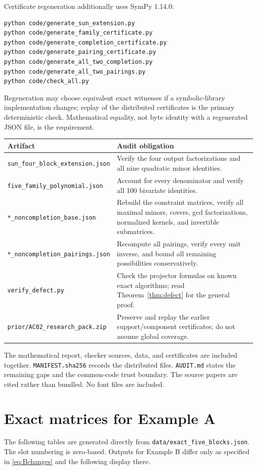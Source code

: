 \documentclass[11pt]{article}
\theoremstyle{definition}\newtheorem{definition}[theorem]{Definition}
\newcommand{\file}[1]{\nolinkurl{#1}}
\begin{document}
Certificate regeneration additionally uses SymPy 1.14.0:
\begin{lstlisting}
python code/generate_sun_extension.py
python code/generate_family_certificate.py
python code/generate_completion_certificate.py
python code/generate_pairing_certificate.py
python code/generate_all_two_completion.py
python code/generate_all_two_pairings.py
python code/check_all.py
\end{lstlisting}
Regeneration may choose equivalent exact witnesses if a symbolic-library implementation changes; replay of the distributed certificates is the primary deterministic check. Mathematical equality, not byte identity with a regenerated JSON file, is the requirement.

\begin{center}\small
\begin{tabularx}{\textwidth}{@{}lX@{}}\toprule
Artifact & Audit obligation\\\midrule
\file{sun_four_block_extension.json} & Verify the four output factorizations and all nine quadratic minor identities.\\
\file{five_family_polynomial.json} & Account for every denominator and verify all 100 bivariate identities.\\
\file{*_noncompletion_base.json} & Rebuild the constraint matrices, verify all maximal minors, covers, gcd factorizations, normalized kernels, and invertible submatrices.\\
\file{*_noncompletion_pairings.json} & Recompute all pairings, verify every unit inverse, and bound all remaining possibilities conservatively.\\
\file{verify_defect.py} & Check the projector formulas on known exact algorithms; read Theorem~\ref{thm:defect} for the general proof.\\
\file{prior/AC02_research_pack.zip} & Preserve and replay the earlier support/component certificates; do not assume global coverage.\\\bottomrule
\end{tabularx}
\end{center}

The mathematical report, checker sources, data, and certificates are included together. \file{MANIFEST.sha256} records the distributed files. \file{AUDIT.md} states the remaining gaps and the common-code trust boundary. The source papers are cited rather than bundled. No font files are included.

\appendix
\section{Exact matrices for Example A}\label{app:data}
The following tables are generated directly from \file{data/exact_five_blocks.json}. The slot numbering is zero-based. Outputs for Example B differ only as specified in \eqref{eq:Bchanges} and the following display there.

\end{document}
